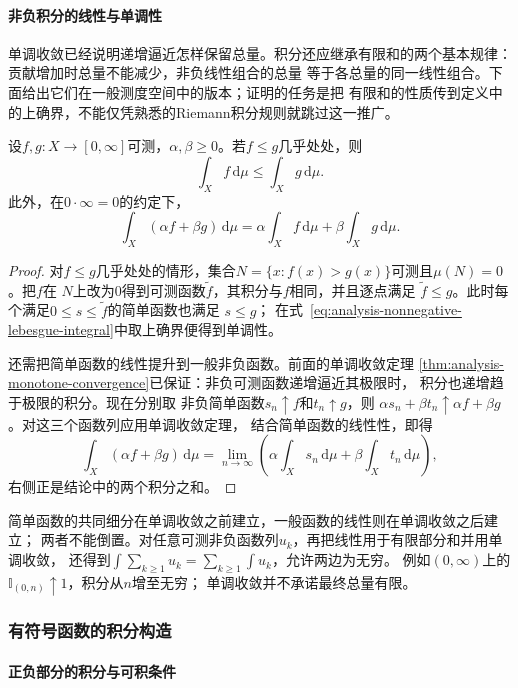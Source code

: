\paragraph{非负积分的线性与单调性}
单调收敛已经说明递增逼近怎样保留总量。积分还应继承有限和的两个基本规律：贡献增加时总量不能减少，非负线性组合的总量
等于各总量的同一线性组合。下面给出它们在一般测度空间中的版本；证明的任务是把
有限和的性质传到定义中的上确界，不能仅凭熟悉的Riemann积分规则就跳过这一推广。
\begin{lemma}[非负积分的线性与单调性]
\label{lem:analysis-nonnegative-integral-properties}
设$f,g:X\to[0,\infty]$可测，$\alpha,\beta\geq0$。若$f\leq g$几乎处处，则
\[
  \int_X f\,\mathrm{d}\mu\leq\int_X g\,\mathrm{d}\mu.
\]
此外，在$0\cdot\infty=0$的约定下，
\[
  \int_X(\alpha f+\beta g)\,\mathrm{d}\mu
  =
  \alpha\int_X f\,\mathrm{d}\mu
  +
  \beta\int_X g\,\mathrm{d}\mu.
\]
\end{lemma}
\begin{proof}
对$f\leq g$几乎处处的情形，集合$N=\{x:f(x)>g(x)\}$可测且$\mu(N)=0$。把$f$在
$N$上改为$0$得到可测函数$\widetilde f$，其积分与$f$相同，并且逐点满足
$\widetilde f\leq g$。此时每个满足$0\leq s\leq\widetilde f$的简单函数也满足
$s\leq g$；
在式~\eqref{eq:analysis-nonnegative-lebesgue-integral}中取上确界便得到单调性。

还需把简单函数的线性提升到一般非负函数。前面的单调收敛定理
\ref{thm:analysis-monotone-convergence}已保证：非负可测函数递增逼近其极限时，
积分也递增趋于极限的积分。现在分别取
非负简单函数$s_n\uparrow f$和$t_n\uparrow g$，则
$\alpha s_n+\beta t_n\uparrow\alpha f+\beta g$。对这三个函数列应用单调收敛定理，
结合简单函数的线性性，即得
\[
  \int_X(\alpha f+\beta g)\,\mathrm{d}\mu
  =
  \lim_{n\to\infty}
  \left(
    \alpha\int_Xs_n\,\mathrm{d}\mu
    +
    \beta\int_Xt_n\,\mathrm{d}\mu
  \right),
\]
右侧正是结论中的两个积分之和。
\end{proof}

简单函数的共同细分在单调收敛之前建立，一般函数的线性则在单调收敛之后建立；
两者不能倒置。对任意可测非负函数列$u_k$，再把线性用于有限部分和并用单调收敛，
还得到$\int\sum_{k\geq1}u_k=\sum_{k\geq1}\int u_k$，允许两边为无穷。
例如$(0,\infty)$上的$\mathbb I_{(0,n)}\uparrow1$，积分从$n$增至无穷；
单调收敛并不承诺最终总量有限。

\subsubsection{有符号函数的积分构造}
\paragraph{正负部分的积分与可积条件}

